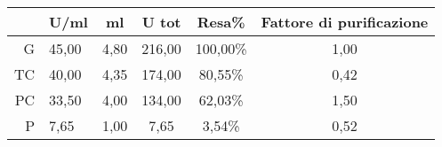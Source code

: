 \begin{tabular}{rlcccc}
\toprule
& U/ml & ml & U tot & Resa\% & Fattore di purificazione\\
\midrule
G & 45,00 & 4,80 & 216,00 & 100,00\% & 1,00 \\
TC & 40,00 & 4,35 & 174,00 & 80,55\% & 0,42 \\
PC & 33,50 & 4,00 & 134,00 & 62,03\% & 1,50 \\
P  & 7,65 & 1,00 & 7,65 & 3,54\% & 0,52 \\
\bottomrule
\end{tabular}